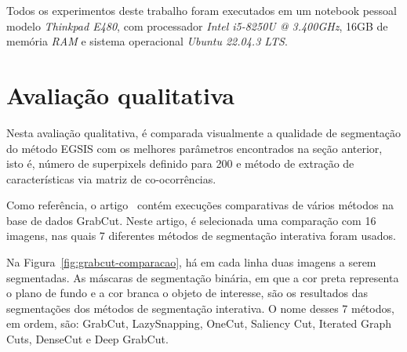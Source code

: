 Todos os experimentos deste trabalho foram executados em um notebook
pessoal modelo \textit{Thinkpad E480}, com processador \textit{Intel i5{-}8250U @
3.400GHz}, 16GB de memória \textit{RAM} e sistema operacional \textit{Ubuntu 22.04.3
LTS}.


\section{Avaliação qualitativa}

Nesta avaliação qualitativa, é comparada visualmente a qualidade
de segmentação do método \gls{EGSIS} com os melhores parâmetros
encontrados na seção anterior, isto é, número de superpixels definido
para 200 e método de extração de características via matriz de
co-ocorrências.

Como referência, o artigo~\cite{wang2023review} contém execuções
comparativas de vários métodos na base de dados GrabCut. Neste artigo,
é selecionada uma comparação com 16 imagens, nas quais 7 diferentes
métodos de segmentação interativa foram usados.

\begin{figure}[h!]
        \captionsetup{width=16cm}
		\centering
\end{figure}
\FloatBarrier{}

Na Figura~\ref{fig:grabcut-comparacao}, há em cada linha duas imagens
a serem segmentadas. As máscaras de segmentação binária, em que
a cor preta representa o plano de fundo e a cor branca o objeto de
interesse, são os resultados das segmentações dos métodos de
segmentação interativa. O nome desses 7 métodos, em ordem, são:
GrabCut, LazySnapping, OneCut, Saliency Cut, Iterated Graph
Cuts\footnotemark{}, DenseCut e Deep GrabCut.


